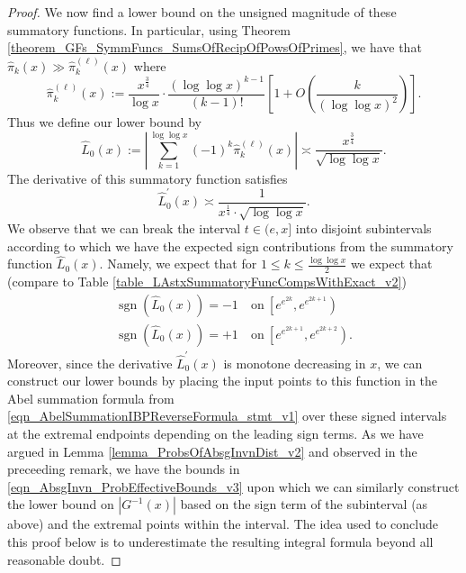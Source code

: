 \documentclass[11pt,reqno,a4letter]{article}
\numberwithin{figure}{section}
\numberwithin{table}{section}
\theoremstyle{plain}
\numberwithin{theorem}{section}
\theoremstyle{definition}
\begin{document}
\begin{proof}
We now find a lower bound on the unsigned magnitude of these summatory functions. 
In particular, using Theorem \ref{theorem_GFs_SymmFuncs_SumsOfRecipOfPowsOfPrimes}, 
we have that $\widehat{\pi}_k(x) \gg \widehat{\pi}_k^{(\ell)}(x)$ where 
\[
\widehat{\pi}_k^{(\ell)}(x) := \frac{x^{\frac{3}{4}}}{\log x} \cdot 
     \frac{(\log\log x)^{k-1}}{(k-1)!} \left[1 + 
     O\left(\frac{k}{(\log\log x)^2}\right)\right].
\]
Thus we define our lower bound by 
\[
\widehat{L}_0(x) := \left\lvert \sum_{k=1}^{\log\log x} (-1)^{k} \widehat{\pi}_k^{(\ell)}(x) \right\rvert 
     \asymp \frac{x^{\frac{3}{4}}}{\sqrt{\log\log x}}. 
\]
The derivative of this summatory function satisfies 
\[
\widehat{L}_0^{\prime}(x) \asymp \frac{1}{x^{\frac{1}{4}} \cdot \sqrt{\log\log x}}. 
\]
We observe that we can break the interval $t \in (e, x]$ into disjoint subintervals 
according to which we have the expected sign contributions from the 
summatory function $\widehat{L}_0(x)$. Namely, we expect that 
for $1 \leq k \leq \frac{\log\log x}{2}$ we expect that 
(compare to Table \ref{table_LAstxSummatoryFuncCompsWithExact_v2}) 
\begin{align*} 
\operatorname{sgn}\left(\widehat{L}_0(x)\right) = -1 & \mathrm{\ on\ } 
     \left[e^{e^{2k}}, e^{e^{2k+1}}\right) \\ 
\operatorname{sgn}\left(\widehat{L}_0(x)\right) = +1 & \mathrm{\ on\ } 
     \left[e^{e^{2k+1}}, e^{e^{2k+2}}\right). 
\end{align*} 
Moreover, since the derivative $\widehat{L}_0^{\prime}(x)$ is monotone decreasing in $x$, 
we can construct our lower bounds by placing the input points to this function 
in the Abel summation formula from 
\eqref{eqn_AbelSummationIBPReverseFormula_stmt_v1} 
over these signed intervals at the extremal endpoints depending on the leading sign terms. 
As we have argued in Lemma \ref{lemma_ProbsOfAbsgInvnDist_v2} and 
observed in the preceeding remark, we have the bounds in 
\eqref{eqn_AbsgInvn_ProbEffectiveBounds_v3} upon which 
we can similarly construct the lower bound on $|G^{-1}(x)|$ based on the 
sign term of the subinterval (as above) and the extremal points within the interval. 
The idea used to conclude this proof below is to underestimate the resulting 
integral formula beyond all reasonable doubt. 


\end{proof}
\end{document}
